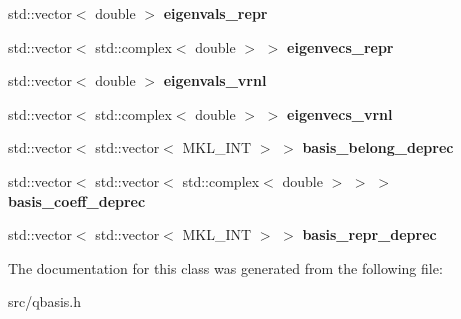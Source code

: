 \begin{DoxyCompactItemize}
\item 
\mbox{\label{classqbasis_1_1model_ab1702fa29618ab76676f106c38918144}} 
std\+::vector$<$ double $>$ {\bfseries eigenvals\+\_\+repr}
\item 
\mbox{\label{classqbasis_1_1model_aa0f6f09ae068c02eaa6c336cdaca1bf2}} 
std\+::vector$<$ std\+::complex$<$ double $>$ $>$ {\bfseries eigenvecs\+\_\+repr}
\item 
\mbox{\label{classqbasis_1_1model_a9533140bb323da075979f56f0a53aafb}} 
std\+::vector$<$ double $>$ {\bfseries eigenvals\+\_\+vrnl}
\item 
\mbox{\label{classqbasis_1_1model_a1e092112065713e5e3591bb08c429844}} 
std\+::vector$<$ std\+::complex$<$ double $>$ $>$ {\bfseries eigenvecs\+\_\+vrnl}
\item 
\mbox{\label{classqbasis_1_1model_a6a3f7a607b57f7f4afe528faaeaf4ed8}} 
std\+::vector$<$ std\+::vector$<$ M\+K\+L\+\_\+\+I\+NT $>$ $>$ {\bfseries basis\+\_\+belong\+\_\+deprec}
\item 
\mbox{\label{classqbasis_1_1model_ae93de7faabeb00fdb1e0d960a45a06d7}} 
std\+::vector$<$ std\+::vector$<$ std\+::complex$<$ double $>$ $>$ $>$ {\bfseries basis\+\_\+coeff\+\_\+deprec}
\item 
\mbox{\label{classqbasis_1_1model_ab7a6eec75cb690401014631408bf5699}} 
std\+::vector$<$ std\+::vector$<$ M\+K\+L\+\_\+\+I\+NT $>$ $>$ {\bfseries basis\+\_\+repr\+\_\+deprec}
\end{DoxyCompactItemize}


The documentation for this class was generated from the following file\+:\begin{DoxyCompactItemize}
\item 
src/qbasis.\+h\end{DoxyCompactItemize}
